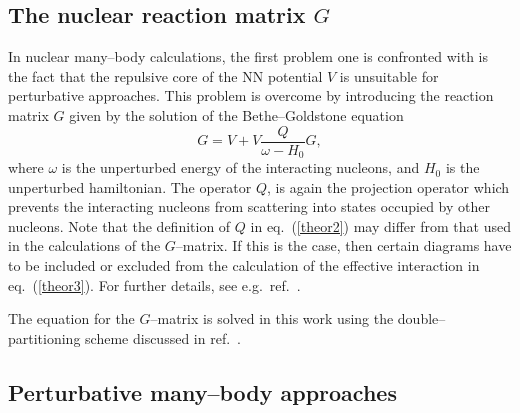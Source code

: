\subsection{The nuclear reaction matrix $G$}

In nuclear many--body calculations, the first problem one is
confronted with is the fact that the repulsive core of the NN potential $V$
is unsuitable for perturbative approaches. This problem is overcome
by introducing the reaction matrix $G$ given by the solution of the
Bethe--Goldstone equation
\begin{equation}
    G=V+V\frac{Q}{\omega - H_0}G,
\end{equation}
where $\omega$ is the unperturbed energy of the interacting nucleons,
and $H_0$ is the unperturbed hamiltonian.
The operator $Q$,
is again the projection operator which prevents the
interacting nucleons from scattering into states occupied by other nucleons.
Note that the definition of $Q$ in eq.~(\ref{theor2}) may differ from that
used in the calculations of the $G$--matrix. If this is the case, then
certain diagrams have to be included or excluded from the calculation
of the effective interaction in eq.~(\ref{theor3}). For further details,
see e.g.\ ref.~\cite{hko94}.

The equation for the $G$--matrix is solved in this work using the
double--partitioning scheme discussed in ref.~\cite{kkko76}.

\subsection{Perturbative many--body approaches}

